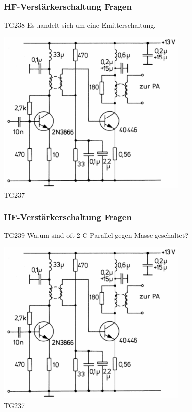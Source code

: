 \begin{frame}
    \frametitle{HF-Verstärkerschaltung Fragen}
        \begin{center}
        \begin{block}{TG238} \large
			 Es handelt sich um eine Emitterschaltung.
    	\end{block}
        \includegraphics[width=0.7\textwidth]{a07/TG237.png}\\
        \tiny TG237 \hyperlink{refs}{\cite{bna}}
    \end{center}
\end{frame}

\begin{frame}
    \frametitle{HF-Verstärkerschaltung Fragen}
        \begin{center}
         \begin{block}{TG239} \large
			 Warum sind oft 2 C Parallel gegen Masse geschaltet?
    	\end{block}
        \includegraphics[width=0.7\textwidth]{a07/TG237.png}\\
        \tiny TG237 \hyperlink{refs}{\cite{bna}}
    \end{center}
\end{frame}


